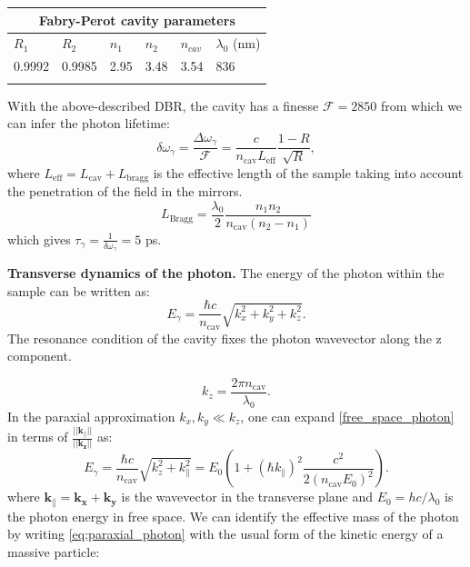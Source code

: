 \begin{center}
    \begin{tabular}{ |p{1.5cm}|p{1.5cm}|p{1.5cm}|p{1.5cm}|p{1.5cm}|p{1.5cm}|}
    \hline
    \multicolumn{6}{|c|}{Fabry-Perot cavity parameters} \\
    \hline
    \hline
    $R_1$ & $R_2$ & $n_1$ & $n_2$ & $n_{cav}$ & $\lambda_0$ (nm) \\
    \hline
    0.9992  &  0.9985 & 2.95 & 3.48 & 3.54 & 836\\
    \hline
    \label{DBR_params}
    \end{tabular}
\end{center}

With the above-described DBR, the cavity has a finesse $\mathcal{F}=2850$ from which we can infer the photon lifetime:
\begin{equation}
    \delta \omega_{\gamma} = \dfrac{\Delta \omega_{\gamma}}{\mathcal{F}} = \dfrac{c}{n_{\mathrm{cav}} L_{\mathrm{eff}}} \dfrac{1-R}{\sqrt{R}},
\end{equation}
where $L_{\mathrm{eff}}= L_{\mathrm{cav}}+L_{\mathrm{bragg}}$ is the effective length of the sample taking into account the penetration of the field in the mirrors.
\begin{equation}
    L_{\mathrm{Bragg}} = \dfrac{\lambda_0}{2} \dfrac{n_1 n_2}{n_{\mathrm{cav}} (n_2 - n_1)}
\end{equation}
which gives $\tau_{\gamma} = \frac{1}{\delta \omega_{\gamma} }= 5$ ps.

\bigskip\noindent
\textbf{Transverse dynamics of the photon.} The energy of the photon within the sample can be written as:
\begin{equation}
    E_\gamma = \dfrac{\hbar c}{n_{\mathrm{cav}}} \sqrt{k_x^2 + k_y^2 + k_z^2}.
\label{free_space_photon}
\end{equation}
The resonance condition of the cavity fixes the photon wavevector along the z component. 

\begin{equation}
    k_z = \dfrac{2\pi n_{\mathrm{cav}}}{\lambda_0}.
    \label{eq:kz}
\end{equation}
In the paraxial approximation $k_x,k_y \ll k_z$, one can expand \eqref{free_space_photon} in terms of $\frac{||\bm{k_{\parallel}}||}{||\bm{k_z}||}$ as:
\begin{equation}
    E_\gamma = \dfrac{\hbar c}{n_{\mathrm{cav}}} \sqrt{k_z^2 + k_{\parallel}^2} = E_0 \left( 1 + (\hbar k_{\parallel })^2 \dfrac{c ^2}{2(n_{\mathrm{cav}} E_0)^2} \right).
    \label{eq:paraxial_photon}
\end{equation}
where $\bm{k_{\parallel}}=\bm{k_x}+\bm{k_y}$ is the wavevector in the transverse plane and $E_0=hc/\lambda_0$ is the photon energy in free space. We can identify the effective mass of the photon by writing \eqref{eq:paraxial_photon} with the usual form of the kinetic energy of a massive particle:

